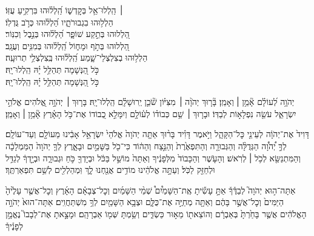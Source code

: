 \documentclass[twoside, openany, parskip=half, 11pt]{book}
\begin{document}
\begin{narrow}
 ׀ \hfill \break
הַֽלְלוּ־אֵ֥ל בְּקׇדְשׁ֑וֹ \hfill הַֽ֝לְל֗וּהוּ בִּרְקִ֥יעַ עֻזּֽוֹ׃\\
הַלְל֥וּהוּ בִגְבוּרֹתָ֑יו \hfill הַ֝לְל֗וּהוּ כְּרֹ֣ב גֻּדְלֽוֹ׃\\
הַ֭לְלוּהוּ בְּתֵ֣קַע שׁוֹפָ֑ר \hfill הַ֝לְל֗וּהוּ בְּנֵ֣בֶל וְכִנּֽוֹר׃\\
הַ֭לְלוּהוּ בְּתֹ֣ף וּמָח֑וֹל \hfill הַֽ֝לְל֗וּהוּ בְּמִנִּ֥ים וְעֻגָֽב׃\\
הַלְל֥וּהוּ בְצִלְצְלֵי־שָׁ֑מַע \hfill הַֽ֝לְל֗וּהוּ בְּֽצִלְצְלֵ֥י תְרוּעָֽה׃\\
כֹּ֣ל הַ֭נְּשָׁמָה תְּהַלֵּ֥ל יָ֗הּ \hfill הַֽלְלוּ־יָֽהּ׃\\ 
\scriptsize{כֹּ֣ל הַ֭נְּשָׁמָה תְּהַלֵּ֥ל יָ֗הּ \hfill הַֽלְלוּ־יָֽהּ׃ \\}
\normalsize{}
 
\end{narrow} 

\negline

 יְהֹוָ֥ה לְ֝עוֹלָ֗ם אָ֘מֵ֥ן ׀ וְאָמֵֽן׃  \hfill \break
{}בָּ֘ר֤וּךְ יְהֹוָ֨ה ׀ מִצִּיּ֗וֹן שֹׁ֘כֵ֤ן יְֽרוּשָׁלָ֗‍ִם הַֽלְלוּ־יָֽהּ׃  \hfill \break
 בָּר֤וּךְ ׀ יְהֹוָ֣ה אֱ֭לֹהִים אֱלֹהֵ֣י יִשְׂרָאֵ֑ל עֹשֵׂ֖ה נִפְלָא֣וֹת לְבַדּֽוֹ׃ \hfill \break
 וּבָר֤וּךְ ׀ שֵׁ֥ם כְּבוֹד֗וֹ לְע֫וֹלָ֥ם וְיִמָּלֵ֣א כְ֭בוֹדוֹ אֶת־כֹּ֥ל הָאָ֗רֶץ אָ֘מֵ֥ן ׀ וְאָמֵֽן׃ 
 




דָּוִיד֙ אֶת־יְהֹוָ֔ה לְעֵינֵ֖י כׇּל־הַקָּהָ֑ל וַיֹּ֣אמֶר דָּוִ֗יד בָּר֨וּךְ אַתָּ֤ה יְהֹוָה֙ אֱלֹהֵי֙ יִשְׂרָאֵ֣ל אָבִ֔ינוּ מֵעוֹלָ֖ם וְעַד־עוֹלָֽם׃
לְךָ֣ יְ֠הֹוָ֠ה הַגְּדֻלָּ֨ה וְהַגְּבוּרָ֤ה וְהַתִּפְאֶ֙רֶת֙ וְהַנֵּ֣צַח וְהַה֔וֹד כִּי־כֹ֖ל בַּשָּׁמַ֣יִם וּבָאָ֑רֶץ לְךָ֤ יְהֹוָה֙ הַמַּמְלָכָ֔ה וְהַמִּתְנַשֵּׂ֖א לְכֹ֥ל ׀ לְרֹֽאשׁ׃
וְהָעֹ֤שֶׁר וְהַכָּבוֹד֙ מִלְּפָנֶ֔יךָ וְאַתָּה֙ מוֹשֵׁ֣ל בַּכֹּ֔ל וּבְיָדְךָ֖ כֹּ֣חַ וּגְבוּרָ֑ה וּבְיָ֣דְךָ֔ לְגַדֵּ֥ל וּלְחַזֵּ֖ק לַכֹּֽל׃
וְעַתָּ֣ה אֱלֹהֵ֔ינוּ מוֹדִ֥ים אֲנַ֖חְנוּ לָ֑ךְ וּֽמְהַלְלִ֖ים לְשֵׁ֥ם תִּפְאַרְתֶּֽךָ׃





  אַתָּה־ה֣וּא
יְהֹוָה֮ לְבַדֶּ֒ךָ֒ אַתָּ֣ עָשִׂ֡יתָ אֶֽת־הַשָּׁמַ֩יִם֩ שְׁמֵ֨י הַשָּׁמַ֜יִם וְכׇל־צְבָאָ֗ם הָאָ֜רֶץ וְכׇל־אֲשֶׁ֤ר עָלֶ֙יהָ֙ הַיַּמִּים֙ וְכׇל־אֲשֶׁ֣ר בָּהֶ֔ם וְאַתָּ֖ה מְחַיֶּ֣ה אֶת־כֻּלָּ֑ם וּצְבָ֥א הַשָּׁמַ֖יִם לְךָ֥ מִשְׁתַּחֲוִֽים׃
אַתָּה־הוּא֙ יְהֹוָ֣ה הָאֱלֹהִ֔ים אֲשֶׁ֤ר בָּחַ֙רְתָּ֙ בְּאַבְרָ֔ם וְהוֹצֵאת֖וֹ מֵא֣וּר כַּשְׂדִּ֑ים וְשַׂ֥מְתָּ שְּׁמ֖וֹ אַבְרָהָֽם׃ וּמָצָ֣אתָ אֶת־לְבָבוֹ֮ נֶאֱמָ֣ן לְפָנֶ֒יךָ֒
\end{document}

